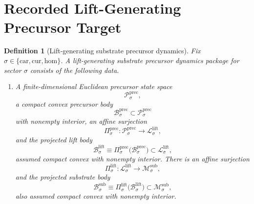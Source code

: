 \documentclass[11pt]{article}
\newcommand{\Car}{\mathrm{car}}
\newcommand{\Cur}{\mathrm{cur}}
\newcommand{\Hom}{\mathrm{hom}}
\newcommand{\SubSpace}[1]{\mathcal M_{#1}^{\mathrm{sub}}}
\newcommand{\SubBody}[1]{\mathcal B_{#1}^{\mathrm{sub}}}
\newcommand{\LiftSpace}[1]{\mathcal L_{#1}^{\mathrm{lift}}}
\newcommand{\LiftBody}[1]{\mathcal B_{#1}^{\mathrm{lift}}}
\newcommand{\LiftProj}[1]{\Pi_{#1}^{\mathrm{lift}}}
\newcommand{\PrecSpace}[1]{\mathcal P_{#1}^{\mathrm{prec}}}
\newcommand{\PrecBody}[1]{\mathcal B_{#1}^{\mathrm{prec}}}
\newcommand{\PrecProj}[1]{\Pi_{#1}^{\mathrm{prec}}}
\newtheorem{definition}{Definition}
\begin{document}
\section{Recorded Lift-Generating Precursor Target}

\begin{definition}[Lift-generating substrate precursor dynamics]
\label{def:prec}
Fix \(\sigma\in\{\Car,\Cur,\Hom\}\). A \emph{lift-generating substrate precursor dynamics package} for sector \(\sigma\) consists of the following data.
\begin{enumerate}
    \item A finite-dimensional Euclidean precursor state space
    \[
    \PrecSpace{\sigma},
    \]
    a compact convex precursor body
    \[
    \PrecBody{\sigma}\subset\PrecSpace{\sigma}
    \]
    with nonempty interior, an affine surjection
    \[
    \PrecProj{\sigma}:\PrecSpace{\sigma}\to\LiftSpace{\sigma},
    \]
    and the projected lift body
    \[
    \LiftBody{\sigma}
    \equiv
    \PrecProj{\sigma}\bigl(\PrecBody{\sigma}\bigr)
    \subset\LiftSpace{\sigma},
    \]
    assumed compact convex with nonempty interior. There is an affine surjection
    \[
    \LiftProj{\sigma}:\LiftSpace{\sigma}\to\SubSpace{\sigma},
    \]
    and the projected substrate body
    \[
    \SubBody{\sigma}
    \equiv
    \LiftProj{\sigma}\bigl(\LiftBody{\sigma}\bigr)
    \subset\SubSpace{\sigma},
    \]
    also assumed compact convex with nonempty interior.


\end{enumerate}
\end{definition}
\end{document}
